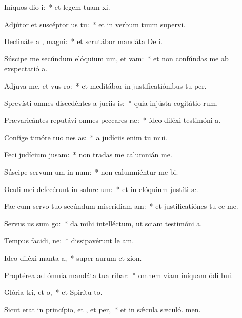 \item Iníquos dio i:~* et legem tuam xi.
\item Adjútor et suscéptor us  tu:~* et in verbum tuum supervi.
\item Declináte a , magni:~* et scrutábor mandáta De i.
\item Súscipe me secúndum elóquium um, et vam:~* et non confúndas me ab exspectatió a.
\item Adjuva me, et vus ro:~* et meditábor in justificatiónibus tu per.
\item Sprevísti omnes discedéntes a juciis is:~* quia injústa cogitátio rum.
\item Prævaricántes reputávi omnes peccares ræ:~* ídeo diléxi testimóni a.
\item Confíge timóre tuo nes as:~* a judíciis enim tu mui.
\item Feci judícium  jusam:~* non tradas me calumnián me.
\item Súscipe servum um in num:~* non calumniéntur me bi.
\item Oculi mei defecérunt in salure um:~* et in elóquium justíti æ.
\item Fac cum servo tuo secúndum miseridiam am:~* et justificatiónes tu ce me.
\item Servus us sum go:~* da mihi intelléctum, ut sciam testimóni a.
\item Tempus facidi, ne:~* dissipavérunt le am.
\item Ideo diléxi manta a,~* super aurum et zion.
\item Proptérea ad ómnia mandáta tua ribar:~* omnem viam iníquam ódi bui.
\item Glória tri, et o,~* et Spirítu to.
\item Sicut erat in princípio, et , et per,~* et in sǽcula sæculó. men.
